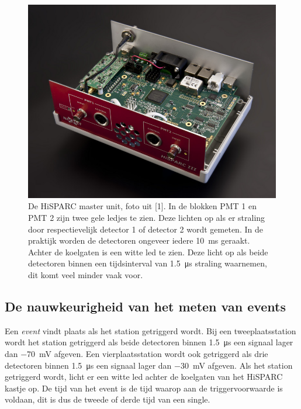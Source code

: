 \begin{figure}[h]
\noindent \begin{centering}
\includegraphics[scale=1.5]{Figures/8cee5cc97a}
\par\end{centering}

\caption{De HiSPARC master unit, foto uit {[}1{]}. In de blokken PMT 1 en PMT
2 zijn twee gele ledjes te zien. Deze lichten op als er straling door
respectievelijk detector 1 of detector 2 wordt gemeten. In de praktijk
worden de detectoren ongeveer iedere \SI{10}{\milli\second} geraakt.
Achter de koelgaten is een witte led te zien. Deze licht op als beide
detectoren binnen een tijdsinterval van \SI{1.5}{\micro\second} straling
waarnemen, dit komt veel minder vaak voor.}
\end{figure}



\subsection{De nauwkeurigheid van het meten van events}

Een \textit{event} vindt plaats als het station getriggerd wordt.
Bij een tweeplaatsstation wordt het station getriggerd als beide detectoren
binnen \SI{1,5}{\micro\second} een signaal lager dan \SI{-70}{\milli\volt}
afgeven. Een vierplaatsstation wordt ook getriggerd als drie detectoren
binnen \SI{1,5}{\micro\second} een signaal lager dan \SI{-30}{\milli\volt}
afgeven. Als het station getriggerd wordt, licht er een witte led
achter de koelgaten van het HiSPARC kastje op. De tijd van het event
is de tijd waarop aan de triggervoorwaarde is voldaan, dit is dus
de tweede of derde tijd van een single.

